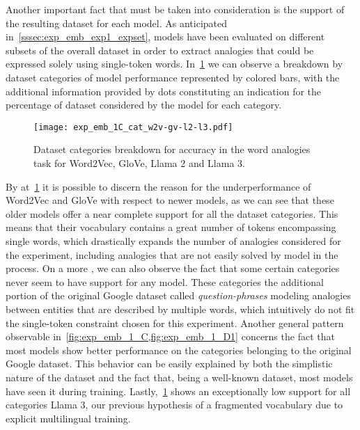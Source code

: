 Another important fact that must be taken into consideration is the support of the resulting dataset for each model.
As anticipated in~\cref{sssec:exp_emb_exp1_expset}, models have been evaluated on different subsets of the overall dataset in order to extract analogies that could be expressed solely using single-token words.
In~\cref{fig:exp_emb_1_C} we can observe a breakdown by dataset categories of model performance represented by colored bars, with the additional information provided by dots constituting an indication for the percentage of dataset considered by the model for each category.

\begin{figure}[t!]
    \centering
    \texttt{[image: exp\_emb\_1C\_cat\_w2v-gv-l2-l3.pdf]}
    \caption[Dataset categories breakdown for accuracy in the word analogies task for various models.]{Dataset categories breakdown for accuracy in the word analogies task for Word2Vec, GloVe, Llama 2 and Llama 3.}
    \label{fig:exp_emb_1_C}
\end{figure}

By  at~\cref{fig:exp_emb_1_C} it is possible to discern the reason for the underperformance of Word2Vec and GloVe with respect to newer models, as we can see that these older models offer a near complete support for all the dataset categories.
This means that their vocabulary contains a great number of tokens encompassing single words, which drastically expands the number of analogies considered for the experiment, including analogies that are not easily solved by model in the process.
On a more , we can also observe the fact that some certain categories never seem to have support for any model.
These categories  the additional portion of the original Google dataset called \emph{question-phrases} modeling analogies between entities that are described by multiple words, which intuitively do not fit the single-token constraint chosen for this experiment.
Another general pattern observable in~\cref{fig:exp_emb_1_C,fig:exp_emb_1_D1} concerns the fact that most models show better performance on the categories belonging to the original Google dataset.
This behavior can be easily explained by both the simplistic nature of the dataset and the fact that, being a well-known dataset, most models have seen it during training.
Lastly,~\cref{fig:exp_emb_1_C} shows an exceptionally low support for all categories  Llama 3,  our previous hypothesis of a fragmented vocabulary due to explicit multilingual training.


